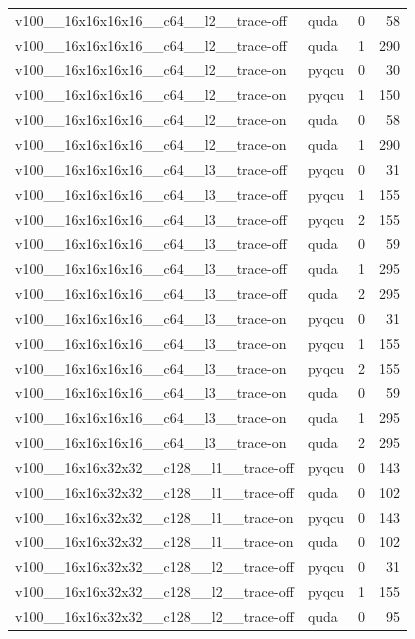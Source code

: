\begin{table}[htbp]
\begin{tabular}{@{}llrr@{}}
v100\_\_16x16x16x16\_\_c64\_\_l2\_\_trace-off & quda & 0 & 58 \\
v100\_\_16x16x16x16\_\_c64\_\_l2\_\_trace-off & quda & 1 & 290 \\
v100\_\_16x16x16x16\_\_c64\_\_l2\_\_trace-on & pyqcu & 0 & 30 \\
v100\_\_16x16x16x16\_\_c64\_\_l2\_\_trace-on & pyqcu & 1 & 150 \\
v100\_\_16x16x16x16\_\_c64\_\_l2\_\_trace-on & quda & 0 & 58 \\
v100\_\_16x16x16x16\_\_c64\_\_l2\_\_trace-on & quda & 1 & 290 \\
v100\_\_16x16x16x16\_\_c64\_\_l3\_\_trace-off & pyqcu & 0 & 31 \\
v100\_\_16x16x16x16\_\_c64\_\_l3\_\_trace-off & pyqcu & 1 & 155 \\
v100\_\_16x16x16x16\_\_c64\_\_l3\_\_trace-off & pyqcu & 2 & 155 \\
v100\_\_16x16x16x16\_\_c64\_\_l3\_\_trace-off & quda & 0 & 59 \\
v100\_\_16x16x16x16\_\_c64\_\_l3\_\_trace-off & quda & 1 & 295 \\
v100\_\_16x16x16x16\_\_c64\_\_l3\_\_trace-off & quda & 2 & 295 \\
v100\_\_16x16x16x16\_\_c64\_\_l3\_\_trace-on & pyqcu & 0 & 31 \\
v100\_\_16x16x16x16\_\_c64\_\_l3\_\_trace-on & pyqcu & 1 & 155 \\
v100\_\_16x16x16x16\_\_c64\_\_l3\_\_trace-on & pyqcu & 2 & 155 \\
v100\_\_16x16x16x16\_\_c64\_\_l3\_\_trace-on & quda & 0 & 59 \\
v100\_\_16x16x16x16\_\_c64\_\_l3\_\_trace-on & quda & 1 & 295 \\
v100\_\_16x16x16x16\_\_c64\_\_l3\_\_trace-on & quda & 2 & 295 \\
v100\_\_16x16x32x32\_\_c128\_\_l1\_\_trace-off & pyqcu & 0 & 143 \\
v100\_\_16x16x32x32\_\_c128\_\_l1\_\_trace-off & quda & 0 & 102 \\
v100\_\_16x16x32x32\_\_c128\_\_l1\_\_trace-on & pyqcu & 0 & 143 \\
v100\_\_16x16x32x32\_\_c128\_\_l1\_\_trace-on & quda & 0 & 102 \\
v100\_\_16x16x32x32\_\_c128\_\_l2\_\_trace-off & pyqcu & 0 & 31 \\
v100\_\_16x16x32x32\_\_c128\_\_l2\_\_trace-off & pyqcu & 1 & 155 \\
v100\_\_16x16x32x32\_\_c128\_\_l2\_\_trace-off & quda & 0 & 95 \\

\end{tabular}
\end{table}

